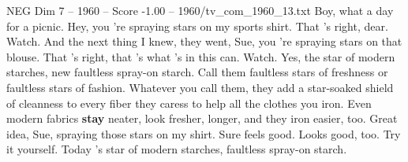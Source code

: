 \begin{textsample}{NEG Dim 7 – 1960 – Score -1.00 – 1960/tv\_com\_1960\_13.txt}  \label{ex:f7_neg_076}
Boy, what a day for a picnic.
Hey, you 're spraying stars on my sports shirt.
That 's right, dear.
Watch.
And the next thing I knew, they went, Sue, you 're spraying stars on that blouse.
That 's right, that 's what 's in this can.
Watch.
Yes, the star of modern starches, new faultless spray-on starch.
Call them faultless stars of freshness or faultless stars of fashion.
Whatever you call them, they add a star-soaked shield of cleanness to every fiber they caress to help all the clothes you iron.
Even modern fabrics \textbf{stay} neater, look fresher, longer, and they iron easier, too.
Great idea, Sue, spraying those stars on my shirt.
Sure feels good.
Looks good, too.
Try it yourself.
Today 's star of modern starches, faultless spray-on starch.

\end{textsample}
